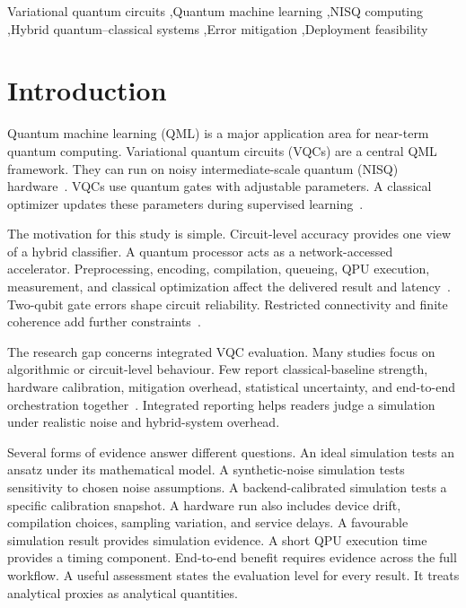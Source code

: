 \documentclass[final,5p,times,number]{elsarticle}
\begin{document}
\begin{frontmatter}
\begin{abstract}
\end{abstract}

\begin{keyword}
  Variational quantum circuits \sep Quantum machine learning \sep NISQ computing \sep Hybrid quantum--classical systems \sep Error mitigation \sep Deployment feasibility
\end{keyword}

\end{frontmatter}

\section{Introduction}
\label{sec:intro}

Quantum machine learning (QML) is a major application area for near-term quantum computing. Variational quantum circuits (VQCs) are a central QML framework. They can run on noisy intermediate-scale quantum (NISQ) hardware~\cite{preskill2018nisq,cerezo2021variational,schuld2015introduction}. VQCs use quantum gates with adjustable parameters. A classical optimizer updates these parameters during supervised learning~\cite{peruzzo2014variational,mcclean2016theory,kandala2017hardware}.

The motivation for this study is simple. Circuit-level accuracy provides one view of a hybrid classifier. A quantum processor acts as a network-accessed accelerator. Preprocessing, encoding, compilation, queueing, QPU execution, measurement, and classical optimization affect the delivered result and latency~\cite{laurent2021orchestrating,parsa2022workflow}. Two-qubit gate errors shape circuit reliability. Restricted connectivity and finite coherence add further constraints~\cite{preskill2018nisq,wack2021quality}.

The research gap concerns integrated VQC evaluation. Many studies focus on algorithmic or circuit-level behaviour. Few report classical-baseline strength, hardware calibration, mitigation overhead, statistical uncertainty, and end-to-end orchestration together~\cite{bharti2022noisy,huang2021power,aaronson2020supremacy}. Integrated reporting helps readers judge a simulation under realistic noise and hybrid-system overhead.

Several forms of evidence answer different questions. An ideal simulation tests an ansatz under its mathematical model. A synthetic-noise simulation tests sensitivity to chosen noise assumptions. A backend-calibrated simulation tests a specific calibration snapshot. A hardware run also includes device drift, compilation choices, sampling variation, and service delays. A favourable simulation result provides simulation evidence. A short QPU execution time provides a timing component. End-to-end benefit requires evidence across the full workflow. A useful assessment states the evaluation level for every result. It treats analytical proxies as analytical quantities.
\end{document}
